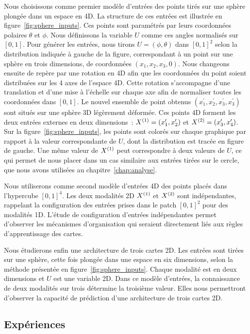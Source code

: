 \documentclass[../main]{subfiles}
\begin{document}
Nous choisissons comme premier modèle d'entrées des points tirés sur une sphère plongée dans un espace en 4D. 
La structure de ces entrées est illustrée en figure~\ref{fig:sphere_inputs}.
Ces points sont paramétrés par leurs coordonnées polaires $\theta$ et $\phi$. Nous définissons la variable $U$ comme ces angles normalisés sur $[0,1]$.
Pour générer les entrées, nous tirons $U = (\phi,\theta)$ dans $[0,1]^2$ selon la distribution indiquée à gauche de la figure, correspondant à un point sur une sphère en trois dimensions, de coordonnées $(x_1,x_2,x_3,0)$. 
Nous changeons ensuite de repère par une rotation en 4D afin que les coordonnées du point soient distribuées sur les 4 axes de l'espace 4D. Cette rotation s'accompagne d'une translation et d'une mise à l'échelle sur chaque axe afin de normaliser toutes les coordonnées dans $[0,1]$. Le nouvel ensemble de point obtenus $(x_1^\prime,x_2^\prime,x_3^\prime,x_3^\prime)$ sont situés sur une sphère 3D légèrement déformée.
Ces points 4D forment les deux entrées externes en deux dimensions~: $X^{({1})} = (x_1^\prime, x_2^\prime)$ et $X^{({2})}= (x_3^\prime, x_4^\prime)$.
Sur la figure~\ref{fig:sphere_inputs}, les points sont colorés sur chaque graphique par rapport à la valeur correspondante de $U$, dont la distribution est tracée en figure de gauche.
Une même valeur de $X^{({1})}$ peut correspondre à deux valeurs de $U$, ce qui permet de nous placer dans un cas similaire aux entrées tirées sur le cercle, que nous avons utilisées au chapitre~\ref{chap:analyse}.

Nous utiliserons comme second modèle d'entrées 4D des points placés dans l'hypercube $[0,1]^4$. Les deux modalités 2D $X^{({1})}$ et $X^{({2})}$ sont indépendantes, rappelant la configuration des entrées prises dans le patch $[0,1]^2$ pour des modalités 1D. 
L'étude de configuration d'entrées indépendantes permet d'observer les mécanismes d'organisation qui seraient directement liés aux règles d'apprentissage des cartes.

Nous étudierons enfin une architecture de trois cartes 2D. Les entrées sont tirées sur une sphère, cette fois plongée dans une espace en six dimensions, selon la méthode présentée en figure~\ref{fig:sphere_inputs}. Chaque modalité est en deux dimensions et $U$ est une variable 2D. Dans ce modèle d'entrées, la connaissance de deux modalités sur trois détermine la troisième valeur. Elles nous permettront d'observer la capacité de prédiction d'une architecture de trois cartes 2D.

\subsection{Expériences}
\end{document}
